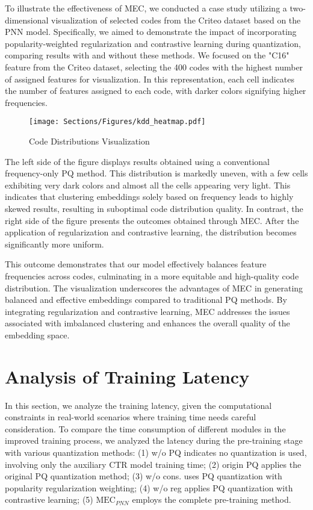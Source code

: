     To illustrate the effectiveness of MEC, we conducted a case study utilizing a two-dimensional visualization of selected codes from the Criteo dataset based on the PNN \cite{PNN} model. Specifically, we aimed to demonstrate the impact of incorporating popularity-weighted regularization and contrastive learning during quantization, comparing results with and without these methods. We focused on the "C16" feature from the Criteo dataset, selecting the 400 codes with the highest number of assigned features for visualization. In this representation, each cell indicates the number of features assigned to each code, with darker colors signifying higher frequencies.  
    \begin{figure}[ht]
        \centering
        \texttt{[image: Sections/Figures/kdd\_heatmap.pdf]}
        \caption{Code Distributions Visualization}
    \label{fig:heatmap}
    \vspace{-10pt}
    \end{figure}
    The left side of the figure displays results obtained using a conventional frequency-only PQ method. This distribution is markedly uneven, with a few cells exhibiting very dark colors and almost all the cells appearing very light. This indicates that clustering embeddings solely based on frequency leads to highly skewed results, resulting in suboptimal code distribution quality. In contrast, the right side of the figure presents the outcomes obtained through MEC. After the application of regularization and contrastive learning, the distribution becomes significantly more uniform.  
    
    This outcome demonstrates that our model effectively balances feature frequencies across codes, culminating in a more equitable and high-quality code distribution. The visualization underscores the advantages of MEC in generating balanced and effective embeddings compared to traditional PQ methods. By integrating regularization and contrastive learning, MEC addresses the issues associated with imbalanced clustering and enhances the overall quality of the embedding space.

\section{Analysis of Training Latency}
\label{app:latency}
In this section, we analyze the training latency, given the computational constraints in real-world scenarios where training time needs careful consideration. 
To compare the time consumption of different modules in the improved training process, we analyzed the latency during the pre-training stage with various quantization methods: (1) w/o PQ indicates no quantization is used, involving only the auxiliary CTR model training time; (2) origin PQ applies the original PQ quantization method; (3) w/o cons. uses PQ quantization with popularity regularization weighting; (4) w/o reg applies PQ quantization with contrastive learning; (5) $\text{MEC}_{PNN}$ employs the complete pre-training method.

